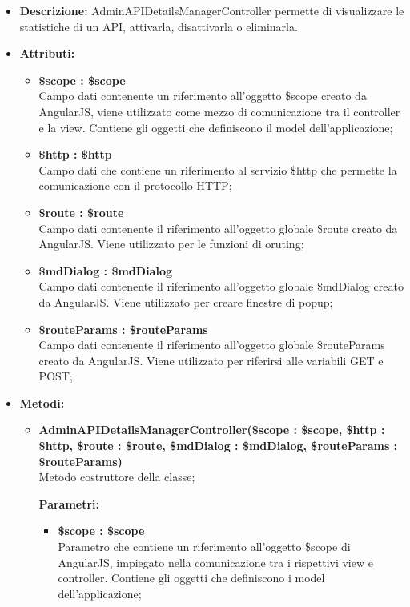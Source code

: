 \begin{itemize}
	\item \textbf{Descrizione:} AdminAPIDetailsManagerController permette di visualizzare le statistiche di un API, attivarla, disattivarla o eliminarla.
	\item \textbf{Attributi:}
	\begin{itemize}
		
		\item \textbf{\$scope : \$scope}\\
		Campo dati contenente un riferimento all'oggetto \$scope creato da AngularJS, viene utilizzato come mezzo di comunicazione tra il controller e la view. Contiene gli oggetti che definiscono il model dell'applicazione;
		
		\item \textbf{\$http : \$http }\\
		Campo dati che contiene un riferimento al servizio \$http che permette la comunicazione con il protocollo HTTP;
		
		\item \textbf{\$route : \$route }\\
		Campo dati contenente il riferimento all'oggetto globale \$route creato da AngularJS. Viene utilizzato per le funzioni di oruting;
		
		\item \textbf{\$mdDialog : \$mdDialog }\\
		Campo dati contenente il riferimento all'oggetto globale \$mdDialog creato da AngularJS. Viene utilizzato per creare finestre di popup;
		
		\item \textbf{\$routeParams : \$routeParams }\\
		Campo dati contenente il riferimento all'oggetto globale \$routeParams creato da AngularJS. Viene utilizzato per riferirsi alle variabili GET e POST;
		
		
	\end{itemize}
	\item \textbf{Metodi:}
	\begin{itemize}
		
		\item \textbf{AdminAPIDetailsManagerController(\$scope : \$scope, \$http : \$http, \$route : \$route, \$mdDialog : \$mdDialog, \$routeParams : \$routeParams)}\\
		Metodo costruttore della classe;
		\begin{description}
			\item[\textbf{Parametri:}]
		\end{description}
		\begin{itemize}
			\item \textbf{\$scope : \$scope}\\
			Parametro che contiene un riferimento all'oggetto \$scope di AngularJS, impiegato nella comunicazione tra i rispettivi view e controller. Contiene gli oggetti che definiscono i model dell'applicazione;
			

\end{itemize}
\end{itemize}
\end{itemize}
